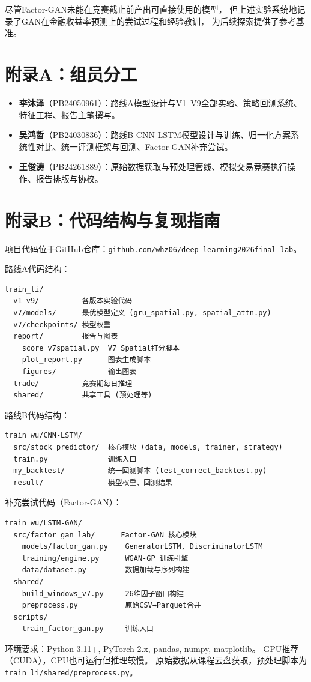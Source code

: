 \documentclass[12pt,a4paper]{ctexart}
\begin{document}
尽管Factor-GAN未能在竞赛截止前产出可直接使用的模型，
但上述实验系统地记录了GAN在金融收益率预测上的尝试过程和经验教训，
为后续探索提供了参考基准。



\section*{附录A：组员分工}

\begin{itemize}[leftmargin=*]
    \item \textbf{李沐泽}（PB24050961）：路线A模型设计与V1--V9全部实验、策略回测系统、特征工程、报告主笔撰写。
    \item \textbf{吴鸿哲}（PB24030836）：路线B CNN-LSTM模型设计与训练、归一化方案系统性对比、统一评测框架与回测、Factor-GAN补充尝试。
    \item \textbf{王俊涛}（PB24261889）：原始数据获取与预处理管线、模拟交易竞赛执行操作、报告排版与协校。
\end{itemize}

\section*{附录B：代码结构与复现指南}

项目代码位于GitHub仓库：\texttt{github.com/whz06/deep-learning2026final-lab}。

路线A代码结构：
\begin{verbatim}
train_li/
  v1-v9/          各版本实验代码
  v7/models/      最优模型定义 (gru_spatial.py, spatial_attn.py)
  v7/checkpoints/ 模型权重
  report/         报告与图表
    score_v7spatial.py  V7 Spatial打分脚本
    plot_report.py      图表生成脚本
    figures/            输出图表
  trade/          竞赛期每日推理
  shared/         共享工具 (预处理等)
\end{verbatim}

路线B代码结构：
\begin{verbatim}
train_wu/CNN-LSTM/
  src/stock_predictor/  核心模块 (data, models, trainer, strategy)
  train.py              训练入口
  my_backtest/          统一回测脚本 (test_correct_backtest.py)
  result/               模型权重、回测结果
\end{verbatim}

补充尝试代码（Factor-GAN）：
\begin{verbatim}
train_wu/LSTM-GAN/
  src/factor_gan_lab/      Factor-GAN 核心模块
    models/factor_gan.py    GeneratorLSTM, DiscriminatorLSTM
    training/engine.py      WGAN-GP 训练引擎
    data/dataset.py         数据加载与序列构建
  shared/
    build_windows_v7.py     26维因子窗口构建
    preprocess.py           原始CSV→Parquet合并
  scripts/
    train_factor_gan.py     训练入口
\end{verbatim}

环境要求：Python 3.11+, PyTorch 2.x, pandas, numpy, matplotlib。
GPU推荐（CUDA），CPU也可运行但推理较慢。
原始数据从课程云盘获取，预处理脚本为 \texttt{train\_li/shared/preprocess.py}。
\end{document}
